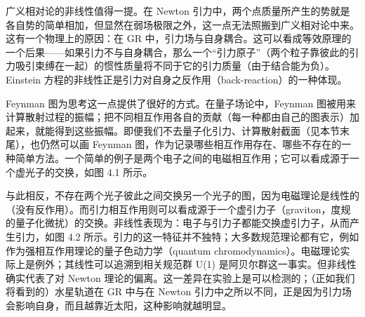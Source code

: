 广义相对论的非线性值得一提。在 Newton 引力中，两个点质量所产生的势就是各自势的简单相加，但显然在弱场极限之外，这一点无法照搬到广义相对论中来。这有一个物理上的原因：在 GR 中，引力场与自身耦合。这可以看成等效原理的一个后果——如果引力不与自身耦合，那么一个“引力原子”（两个粒子靠彼此的引力吸引束缚在一起）的惯性质量将不同于它的引力质量（由于结合能为负）。Einstein 方程的非线性正是引力对自身之反作用（back-reaction）的一种体现。

Feynman 图为思考这一点提供了很好的方式。在量子场论中，Feynman 图被用来计算散射过程的振幅；把不同相互作用各自的贡献（每一种都由自己的图表示）加起来，就能得到这些振幅。即便我们不去量子化引力、计算散射截面（见本节末尾），也仍然可以画 Feynman 图，作为记录哪些相互作用存在、哪些不存在的一种简单方法。一个简单的例子是两个电子之间的电磁相互作用；它可以看成源于一个虚光子的交换，如图 4.1 所示。

与此相反，不存在两个光子彼此之间交换另一个光子的图，因为电磁理论是线性的（没有反作用）。而引力相互作用则可以看成源于一个虚引力子（graviton，度规的量子化微扰）的交换。非线性表现为：电子与引力子都能交换虚引力子，从而产生引力，如图 4.2 所示。引力的这一特征并不独特；大多数规范理论都有它，例如作为强相互作用理论的量子色动力学（quantum chromodynamics）。电磁理论实际上是例外；其线性可以追溯到相关规范群 U(1) 是阿贝尔群这一事实。但非线性确实代表了对 Newton 理论的偏离。这一差异在实验上是可以检测的；（正如我们将看到的）水星轨道在 GR 中与在 Newton 引力中之所以不同，正是因为引力场会影响自身，而且越靠近太阳，这种影响就越明显。

